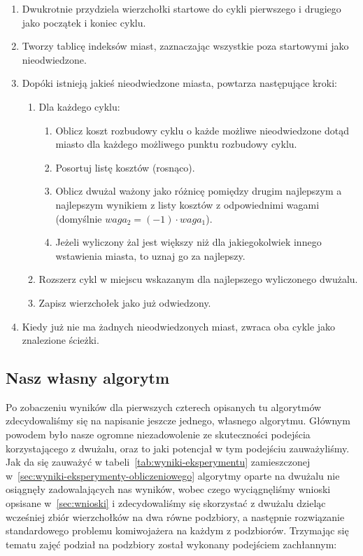 \documentclass[11pt]{article}
\begin{document}
\begin{enumerate}
    \item Dwukrotnie przydziela wierzchołki startowe do cykli pierwszego i drugiego jako początek i koniec cyklu.
    \item Tworzy tablicę indeksów miast, zaznaczając wszystkie poza startowymi jako nieodwiedzone.
    \item Dopóki istnieją jakieś nieodwiedzone miasta, powtarza następujące kroki:
    \begin{enumerate}
        \item Dla każdego cyklu:
        \begin{enumerate}
            \item Oblicz koszt rozbudowy cyklu o każde możliwe nieodwiedzone dotąd miasto dla każdego możliwego punktu rozbudowy cyklu.
            \item Posortuj listę kosztów (rosnąco).
            \item Oblicz dwużal ważony jako różnicę pomiędzy drugim najlepszym a najlepszym wynikiem z listy kosztów z odpowiednimi wagami (domyślnie $waga_2 = (-1) \cdot waga_1$).
            \item Jeżeli wyliczony żal jest większy niż dla jakiegokolwiek innego wstawienia miasta, to uznaj go za najlepszy.
        \end{enumerate}
        \item Rozszerz cykl w miejscu wskazanym dla najlepszego wyliczonego dwużalu.
        \item Zapisz wierzchołek jako już odwiedzony.
    \end{enumerate}
    \item Kiedy już nie ma żadnych nieodwiedzonych miast, zwraca oba cykle jako znalezione ścieżki.
\end{enumerate}

\subsection{Nasz własny algorytm}\label{subsec:nasz-wasny-algorytm}

Po zobaczeniu wyników dla pierwszych czterech opisanych tu algorytmów zdecydowaliśmy się na napisanie jeszcze jednego, własnego algorytmu.
Głównym powodem było nasze ogromne niezadowolenie ze skuteczności podejścia korzystającego z dwużalu, oraz to jaki potencjał w tym podejściu zauważyliśmy.
Jak da się zauważyć w tabeli~\ref{tab:wyniki-eksperymentu} zamieszczonej w~\ref{sec:wyniki-eksperymenty-obliczeniowego} algorytmy oparte na dwużalu nie osiągnęły zadowalających nas wyników,
wobec czego wyciągnęliśmy wnioski opsisane w~\ref{sec:wnioski} i zdecydowaliśmy się skorzystać z dwużalu dzieląc wcześniej zbiór wierzchołków na dwa równe podzbiory,
a następnie rozwiązanie standardowego problemu komiwojażera na każdym z podzbiorów.
Trzymając się tematu zajęć podział na podzbiory został wykonany podejściem zachłannym:
\end{document}
